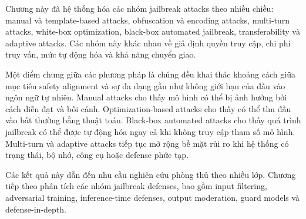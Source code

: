 Chương này đã hệ thống hóa các nhóm jailbreak attacks theo nhiều chiều:
manual và template-based attacks, obfuscation và encoding attacks,
multi-turn attacks, white-box optimization, black-box automated jailbreak,
transferability và adaptive attacks. Các nhóm này khác nhau về giả định
quyền truy cập, chi phí truy vấn, mức tự động hóa và khả năng chuyển giao.

Một điểm chung giữa các phương pháp là chúng đều khai thác khoảng cách giữa
mục tiêu safety alignment và sự đa dạng gần như không giới hạn của đầu vào
ngôn ngữ tự nhiên. Manual attacks cho thấy mô hình có thể bị ảnh hưởng bởi
cách diễn đạt và bối cảnh. Optimization-based attacks cho thấy có thể tìm
đầu vào bất thường bằng thuật toán. Black-box automated attacks cho thấy
quá trình jailbreak có thể được tự động hóa ngay cả khi không truy cập
tham số mô hình. Multi-turn và adaptive attacks tiếp tục mở rộng bề mặt rủi
ro khi hệ thống có trạng thái, bộ nhớ, công cụ hoặc defense phức tạp.

Các kết quả này dẫn đến nhu cầu nghiên cứu phòng thủ theo nhiều lớp. Chương
tiếp theo phân tích các nhóm jailbreak defenses, bao gồm input filtering,
adversarial training, inference-time defenses, output moderation, guard
models và defense-in-depth.
